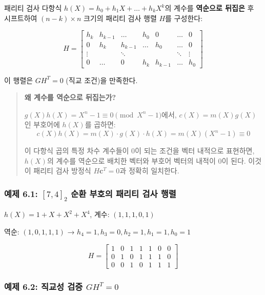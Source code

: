 \documentclass[
  oneside]{article}
\begin{document}
패리티 검사 다항식 \(h(X) = h_0 + h_1 X + \dots + h_k X^k\)의 계수를
\textbf{역순으로 뒤집은} 후 시프트하여 \((n-k) \times n\) 크기의 패리티
검사 행렬 \(H\)를 구성한다:

\[H = \begin{bmatrix}
h_k & h_{k-1} & \dots & h_0 & 0 & \dots & 0 \\
0 & h_k & h_{k-1} & \dots & h_0 & \dots & 0 \\
\vdots & & \ddots & & & \ddots & \vdots \\
0 & \dots & 0 & h_k & h_{k-1} & \dots & h_0
\end{bmatrix}\]

이 행렬은 \(G H^T = 0\) (직교 조건)을 만족한다.

\begin{quote}
\textbf{왜 계수를 역순으로 뒤집는가?}

\(g(X)h(X) = X^n - 1 \equiv 0 \pmod{X^n - 1}\)에서,
\(c(X) = m(X)g(X)\)인 부호어에 \(h(X)\)를 곱하면:
\[c(X)h(X) = m(X) \cdot g(X) \cdot h(X) = m(X)(X^n - 1) \equiv 0\]

이 다항식 곱의 특정 차수 계수들이 0이 되는 조건을 벡터 내적으로
표현하면, \(h(X)\)의 계수를 역순으로 배치한 벡터와 부호어 벡터의 내적이
0이 된다. 이것이 패리티 검사 방정식 \(H\mathbf{c}^T = 0\)과 정확히
일치한다.
\end{quote}

\subsubsection{\texorpdfstring{예제 6.1: \([7, 4]_2\) 순환 부호의 패리티
검사
행렬}{예제 6.1: {[}7, 4{]}\_2 순환 부호의 패리티 검사 행렬}}\label{uxc608uxc81c-6.1-7-4_2-uxc21cuxd658-uxbd80uxd638uxc758-uxd328uxb9acuxd2f0-uxac80uxc0ac-uxd589uxb82c}

\(h(X) = 1 + X + X^2 + X^4\), 계수: \((1, 1, 1, 0, 1)\)

역순: \((1, 0, 1, 1, 1)\) →
\(h_4 = 1, h_3 = 0, h_2 = 1, h_1 = 1, h_0 = 1\)

\[H = \begin{bmatrix}
1 & 0 & 1 & 1 & 1 & 0 & 0 \\
0 & 1 & 0 & 1 & 1 & 1 & 0 \\
0 & 0 & 1 & 0 & 1 & 1 & 1
\end{bmatrix}\]

\subsubsection{\texorpdfstring{예제 6.2: 직교성 검증
\(GH^T = 0\)}{예제 6.2: 직교성 검증 GH\^{}T = 0}}\label{uxc608uxc81c-6.2-uxc9c1uxad50uxc131-uxac80uxc99d-ght-0}
\end{document}

